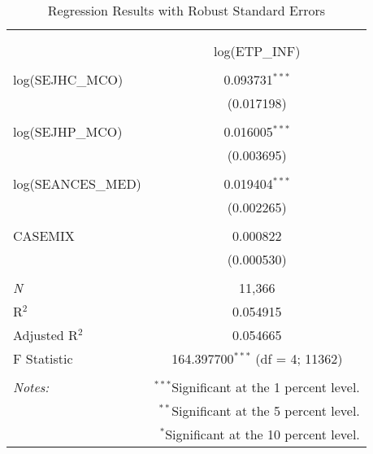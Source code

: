 
\begin{table}[!htbp] \centering 
  \caption{Regression Results with Robust Standard Errors} 
  \label{tab:reg_inf_robust} 
\begin{tabular}{@{\extracolsep{5pt}}lc} 
\\[-1.8ex]\hline 
\hline \\[-1.8ex] 
\\[-1.8ex] & log(ETP\_INF) \\ 
\hline \\[-1.8ex] 
 log(SEJHC\_MCO) & 0.093731$^{***}$ \\ 
  & (0.017198) \\ 
  & \\ 
 log(SEJHP\_MCO) & 0.016005$^{***}$ \\ 
  & (0.003695) \\ 
  & \\ 
 log(SEANCES\_MED) & 0.019404$^{***}$ \\ 
  & (0.002265) \\ 
  & \\ 
 CASEMIX & 0.000822 \\ 
  & (0.000530) \\ 
  & \\ 
\textit{N} & 11,366 \\ 
R$^{2}$ & 0.054915 \\ 
Adjusted R$^{2}$ & 0.054665 \\ 
F Statistic & 164.397700$^{***}$ (df = 4; 11362) \\ 
\hline 
\hline \\[-1.8ex] 
\textit{Notes:} & \multicolumn{1}{r}{$^{***}$Significant at the 1 percent level.} \\ 
 & \multicolumn{1}{r}{$^{**}$Significant at the 5 percent level.} \\ 
 & \multicolumn{1}{r}{$^{*}$Significant at the 10 percent level.} \\ 
\end{tabular} 
\end{table} 
